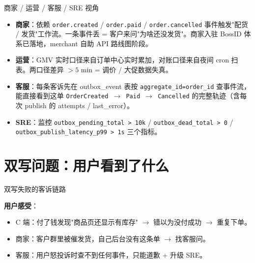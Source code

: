 \documentclass[aspectratio=169,11pt]{beamer}
\begin{document}
\begin{frame}[shrink]{商家 / 运营 / 客服 / SRE 视角}
\begin{itemize}
  \item \textbf{商家}：依赖 \texttt{order.created} / \texttt{order.paid} / \texttt{order.cancelled} 事件触发"配货 / 发货"工作流。一条事件丢 = 客户来问"为啥还没发货"。商家入驻 BossID 体系已落地，merchant 自助 API 路线图阶段。
  \item \textbf{运营}：GMV 实时口径来自订单中心实时累加，对账口径来自夜间 cron 扫表。两口径差异 $> 5$ min = 调价 / 大促数据失真。
  \item \textbf{客服}：每条客诉先在 outbox\_event 表按 \texttt{aggregate\_id=order\_id} 查事件流，能直接看到这单 \texttt{OrderCreated $\to$ Paid $\to$ Cancelled} 的完整轨迹（含每次 publish 的 attempts / last\_error）。
  \item \textbf{SRE}：监控 \texttt{outbox\_pending\_total > 10k} / \texttt{outbox\_dead\_total > 0} / \texttt{outbox\_publish\_latency\_p99 > 1s} 三个指标。
\end{itemize}
\end{frame}

\section{双写问题：用户看到了什么}

\begin{frame}[shrink]{双写失败的客诉链路}
\vspace{2mm}
\small \textbf{用户感受}：
\begin{itemize}
  \item C 端：付了钱发现"商品页还显示有库存" $\to$ 错以为没付成功 $\to$ 重复下单。
  \item 商家：客户群里被催发货，自己后台没有这条单 $\to$ 找客服问。
  \item 客服：用户怒投诉时查不到任何事件，只能道歉 + 升级 SRE。
\end{itemize}
\end{frame}
\end{document}

